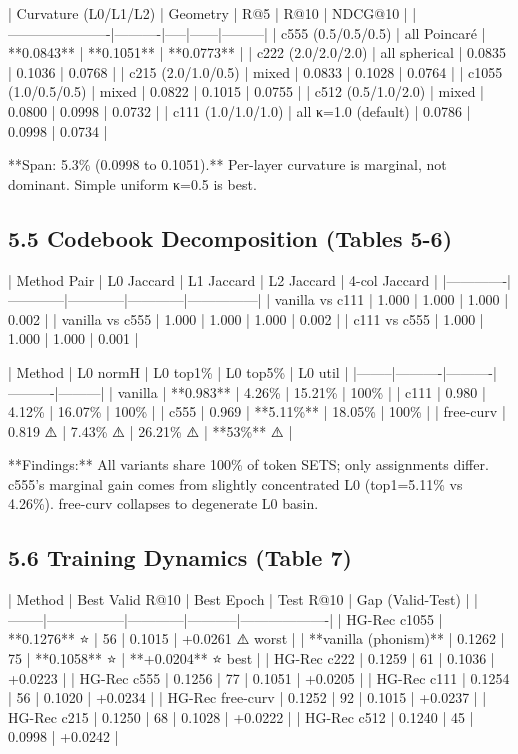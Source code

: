 \documentclass[11pt]{article}
\begin{document}
| Curvature (L0/L1/L2) | Geometry | R@5 | R@10 | NDCG@10 |
|----------------------|----------|-----|------|---------|
| c555 (0.5/0.5/0.5) | all Poincaré | **0.0843** | **0.1051** | **0.0773** |
| c222 (2.0/2.0/2.0) | all spherical | 0.0835 | 0.1036 | 0.0768 |
| c215 (2.0/1.0/0.5) | mixed | 0.0833 | 0.1028 | 0.0764 |
| c1055 (1.0/0.5/0.5) | mixed | 0.0822 | 0.1015 | 0.0755 |
| c512 (0.5/1.0/2.0) | mixed | 0.0800 | 0.0998 | 0.0732 |
| c111 (1.0/1.0/1.0) | all κ=1.0 (default) | 0.0786 | 0.0998 | 0.0734 |

**Span: 5.3\% (0.0998 to 0.1051).** Per-layer curvature is marginal, not dominant. Simple uniform κ=0.5 is best.


\subsection{5.5 Codebook Decomposition (Tables 5-6)}

| Method Pair | L0 Jaccard | L1 Jaccard | L2 Jaccard | 4-col Jaccard |
|-------------|------------|------------|------------|---------------|
| vanilla vs c111 | 1.000 | 1.000 | 1.000 | 0.002 |
| vanilla vs c555 | 1.000 | 1.000 | 1.000 | 0.002 |
| c111 vs c555 | 1.000 | 1.000 | 1.000 | 0.001 |

| Method | L0 normH | L0 top1\% | L0 top5\% | L0 util |
|--------|----------|----------|----------|---------|
| vanilla | **0.983** | 4.26\% | 15.21\% | 100\% |
| c111 | 0.980 | 4.12\% | 16.07\% | 100\% |
| c555 | 0.969 | **5.11\%** | 18.05\% | 100\% |
| free-curv | 0.819 ⚠️ | 7.43\% ⚠️ | 26.21\% ⚠️ | **53\%** ⚠️ |

**Findings:** All variants share 100\% of token SETS; only assignments differ. c555's marginal gain comes from slightly concentrated L0 (top1=5.11\% vs 4.26\%). free-curv collapses to degenerate L0 basin.


\subsection{5.6 Training Dynamics (Table 7)}

| Method | Best Valid R@10 | Best Epoch | Test R@10 | Gap (Valid-Test) |
|--------|-----------------|------------|-----------|-------------------|
| HG-Rec c1055 | **0.1276** ⭐ | 56 | 0.1015 | +0.0261 ⚠️ worst |
| **vanilla (phonism)** | 0.1262 | 75 | **0.1058** ⭐ | **+0.0204** ⭐ best |
| HG-Rec c222 | 0.1259 | 61 | 0.1036 | +0.0223 |
| HG-Rec c555 | 0.1256 | 77 | 0.1051 | +0.0205 |
| HG-Rec c111 | 0.1254 | 56 | 0.1020 | +0.0234 |
| HG-Rec free-curv | 0.1252 | 92 | 0.1015 | +0.0237 |
| HG-Rec c215 | 0.1250 | 68 | 0.1028 | +0.0222 |
| HG-Rec c512 | 0.1240 | 45 | 0.0998 | +0.0242 |
\end{document}
